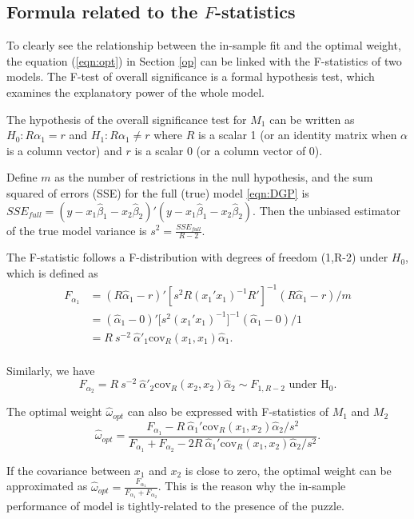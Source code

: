 \documentclass{monashthesis}
\begin{document}
\hypertarget{formula-related-to-the-f-statistics}{%
\subsection{\texorpdfstring{Formula related to the \(F\)-statistics}{Formula related to the F-statistics}}\label{formula-related-to-the-f-statistics}}

To clearly see the relationship between the in-sample fit and the optimal weight, the equation (\ref{eqn:opt}) in Section \ref{op} can be linked with the F-statistics of two models. The F-test of overall significance is a formal hypothesis test, which examines the explanatory power of the whole model.

The hypothesis of the overall significance test for \(M_1\) can be written as \(H_0: R\alpha_1 = r\) and \(H_1: R\alpha_1 \ne r\) where \(R\) is a scalar 1 (or an identity matrix when \(\alpha\) is a column vector) and \(r\) is a scalar 0 (or a column vector of 0).

Define \(m\) as the number of restrictions in the null hypothesis, and the sum squared of errors (SSE) for the full (true) model \ref{eqn:DGP} is \(SSE_{full} = (y - x_1 \hat\beta_1 - x_2 \hat\beta_2)'(y - x_1 \hat\beta_1 - x_2 \hat\beta_2)\). Then the unbiased estimator of the true model variance is \(s^2=\frac{SSE_{full}}{R-2}\).

The F-statistic follows a F-distribution with degrees of freedom (1,R-2) under \(H_0\), which is defined as
\begin{align*}
F_{\alpha_1} &= (R\hat\alpha_1 - r)'[s^2R(x_1'x_1)^{-1}R']^{-1}(R\hat\alpha_1 - r)/m \\
&= (\hat\alpha_1 - 0)' \Big[s^2(x_1'x_1)^{-1}\Big]^{-1} (\hat\alpha_1 - 0)/1 \\
&= R \ s^{-2} \ \hat\alpha'_1 \text{cov}_R(x_1,x_1) \hat\alpha_1. \\
\end{align*}

Similarly, we have
\begin{equation*}
F_{\alpha_2} = R \ s^{-2} \ \hat\alpha'_2 \text{cov}_R(x_2,x_2) \hat\alpha_2 \sim F_{1,R-2} \text{ under  H}_0.
\end{equation*}

The optimal weight \(\hat\omega_{opt}\) can also be expressed with F-statistics of \(M_1\) and \(M_2\)
\begin{equation*}
\hat\omega_{opt} = \frac{F_{\alpha_1}- R \ \hat\alpha_1'\text{cov}_R(x_1,x_2)\hat\alpha_2/s^2}{F_{\alpha_1} + F_{\alpha_2} - 2 R \ \hat\alpha_1'\text{cov}_R(x_1,x_2)\hat\alpha_2/s^2}.
\end{equation*}

If the covariance between \(x_1\) and \(x_2\) is close to zero, the optimal weight can be approximated as \(\hat\omega_{opt} = \frac{F_{\alpha_1}}{F_{\alpha_1} + F_{\alpha_2}}\). This is the reason why the in-sample performance of model is tightly-related to the presence of the puzzle.

\printbibliography[title={Reference}]
\end{document}

